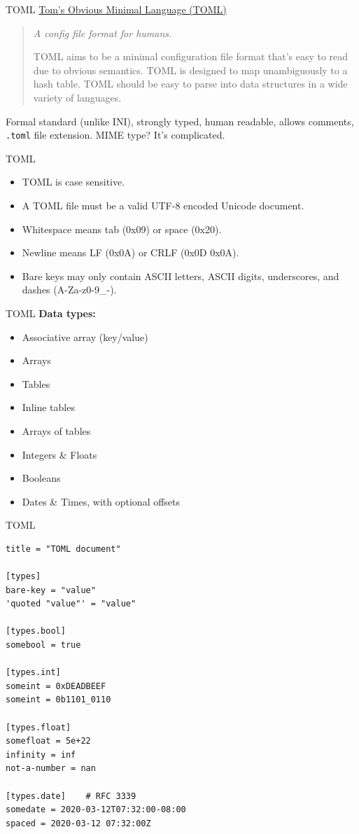 \documentclass{beamer}
\begin{document}
\begin{frame}[fragile]{TOML}
  \href{https://toml.io/en/}{Tom's Obvious Minimal Language (TOML)}

  \begin{quote}
    \emph{A config file format for humans.}

    TOML aims to be a minimal configuration file format that's easy to read due to obvious semantics. TOML is designed to map unambiguously to a hash table. TOML should be easy to parse into data structures in a wide variety of languages. 
  \end{quote}

  Formal standard (unlike INI), strongly typed, human readable, allows comments, \texttt{.toml} file extension. MIME type? It's complicated.
\end{frame}

\begin{frame}[fragile]{TOML}
  \begin{itemize}
    \item TOML is case sensitive.
    \item A TOML file must be a valid UTF-8 encoded Unicode document.
    \item Whitespace means tab (0x09) or space (0x20).
    \item Newline means LF (0x0A) or CRLF (0x0D 0x0A).
    \item Bare keys may only contain ASCII letters, ASCII digits, underscores, and dashes (A-Za-z0-9\_-).
  \end{itemize}
\end{frame}

\begin{frame}[fragile]{TOML}
  \textbf{Data types:}
  \begin{itemize}
    \item Associative array (key/value)
    \item Arrays
    \item Tables
    \item Inline tables
    \item Arrays of tables
    \item Integers \& Floats
    \item Booleans
    \item Dates \& Times, with optional offsets
  \end{itemize}
\end{frame}

\begin{frame}[fragile]{TOML}
  \begin{verbatim}
title = "TOML document"

[types]
bare-key = "value"
'quoted "value"' = "value"

[types.bool]
somebool = true

[types.int]
someint = 0xDEADBEEF
someint = 0b1101_0110

[types.float]
somefloat = 5e+22
infinity = inf
not-a-number = nan

[types.date]    # RFC 3339
somedate = 2020-03-12T07:32:00-08:00
spaced = 2020-03-12 07:32:00Z
  \end{verbatim}
\end{frame}
\end{document}
